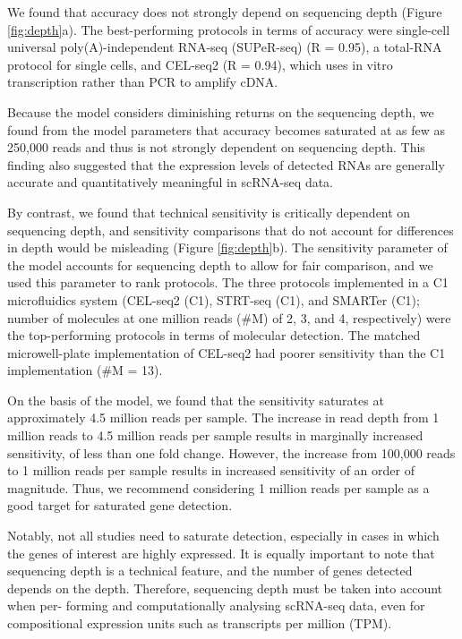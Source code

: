 We found that accuracy does not strongly depend on sequencing depth (Figure \ref{fig:depth}a). The best-performing protocols in terms of accuracy were single-cell universal poly(A)-independent RNA-seq (SUPeR-seq) (R = 0.95), a total-RNA protocol for single cells, and CEL-seq2 (R = 0.94), which uses in vitro transcription rather than PCR to amplify cDNA.

Because the model considers diminishing returns on the sequencing depth, we found from the model parameters that accuracy becomes saturated at as few as 250,000 reads and thus is not strongly dependent on sequencing depth. This finding also suggested that the expression levels of detected RNAs are generally accurate and quantitatively meaningful in scRNA-seq data.

By contrast, we found that technical sensitivity is critically dependent on sequencing depth, and sensitivity comparisons that do not account for differences in depth would be misleading (Figure \ref{fig:depth}b). The sensitivity parameter of the model accounts for sequencing depth to allow for fair comparison, and we used this parameter to rank protocols. The three protocols implemented in a C1 microfluidics system (CEL-seq2 (C1), STRT-seq (C1), and SMARTer (C1); number of molecules at one million reads (\#M) of 2, 3, and 4, respectively) were the top-performing protocols in terms of molecular detection. The matched microwell-plate implementation of CEL-seq2 had poorer sensitivity than the C1 implementation (\#M = 13).

On the basis of the model, we found that the sensitivity saturates at approximately 4.5 million reads per sample. The increase in read depth from 1 million reads to 4.5 million reads per sample results in marginally increased sensitivity, of less than one fold change. However, the increase from 100,000 reads to 1 million reads per sample results in increased sensitivity of an order of magnitude. Thus, we recommend considering 1 million reads per sample as a good target for saturated gene detection.

Notably, not all studies need to saturate detection, especially in cases in which the genes of interest are highly expressed. It is equally important to note that sequencing depth is a technical feature, and the number of genes detected depends on the depth. Therefore, sequencing depth must be taken into account when per- forming and computationally analysing scRNA-seq data, even for compositional expression units such as transcripts per million (TPM).

